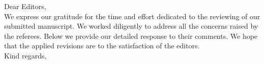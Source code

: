 Dear Editors,%
\\[2em]
We express our gratitude for the time and effort dedicated to the reviewing of our submitted manuscript. We worked diligently to address all the concerns raised by the referees. Below we provide our detailed response to their comments.
We hope that the applied revisions are to the satisfaction of the editors.
\\[2em]
Kind regards,
\begin{flushright}
\AuthorsInSignature
\end{flushright}
